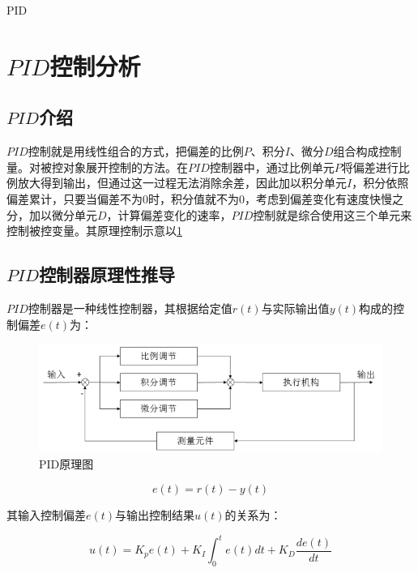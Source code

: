 \documentclass{MathorCupmodeling}
\begin{document}
\begin{center}
{\Large PID}

\end{center}
    \newpage


	\section{$PID$控制分析}

\subsection{$PID$介绍}

$PID$控制就是用线性组合的方式，把偏差的比例$P$、积分$I$、微分$D$组合构成控制量。对被控对象展开控制的方法。在$PID$控制器中，通过比例单元$P$将偏差进行比例放大得到输出，但通过这一过程无法消除余差，因此加以积分单元$I$，积分依照偏差累计，只要当偏差不为0时，积分值就不为0，考虑到偏差变化有速度快慢之分，加以微分单元$D$，计算偏差变化的速率，$PID$控制就是综合使用这三个单元来控制被控变量。其原理控制示意以\cref{PID原理}

\subsection{$PID$控制器原理性推导}
	
$PID$控制器是一种线性控制器，其根据给定值$r(t)$与实际输出值$y(t)$构成的控制偏差$e(t)$为：

\begin{figure}[hbpt]
\centering
\includegraphics[width=12cm]{PID原理.png}
\caption{PID原理图}\label{PID原理}
\end{figure}

\begin{equation}
e(t)=r(t)-y(t)
\end{equation}

其输入控制偏差$e(t)$与输出控制结果$u(t)$的关系为：

\begin{equation}
u(t)=K_pe(t)+K_I\int_0^te(t)dt+K_D \frac{de(t)}{dt}
\end{equation}
\end{document}
